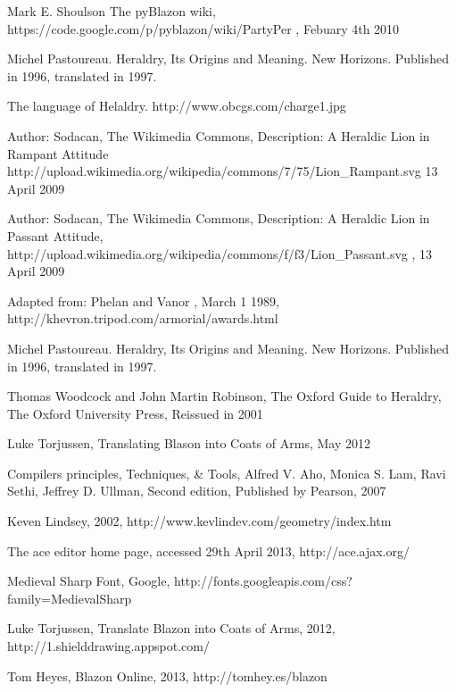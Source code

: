 \begin{thebibliography}{100}

  	Mark E. Shoulson
 	The pyBlazon wiki, 
 	https://code.google.com/p/pyblazon/wiki/PartyPer , 
 	Febuary 4th 2010


	Michel Pastoureau. 
	Heraldry, Its Origins and Meaning.
	New Horizons. 
	Published in 1996, translated in 1997.


	The language of Helaldry.
	http://www.obcgs.com/charge1.jpg

	Author: Sodacan,  
	The Wikimedia Commons,
	Description: A Heraldic Lion in Rampant Attitude
	http://upload.wikimedia.org/wikipedia/commons/7/75/Lion\_Rampant.svg
	13 April 2009

	Author: Sodacan,
	The Wikimedia Commons, 
	Description: A Heraldic Lion in Passant Attitude, 
	http://upload.wikimedia.org/wikipedia/commons/f/f3/Lion\_Passant.svg ,
	13 April 2009
	
	Adapted from: 
	Phelan and Vanor , 
	March 1 1989, 
	http://khevron.tripod.com/armorial/awards.html


	Michel Pastoureau. 
	Heraldry, Its Origins and Meaning.
	New Horizons. 
	Published in 1996, translated in 1997.


	Thomas Woodcock and John Martin Robinson, 
	The Oxford Guide to Heraldry, 
	The Oxford University Press, 
	Reissued in 2001


	Luke Torjussen, 
	Translating Blason into Coats of Arms, 
	May 2012

	Compilers principles, Techniques, \& Tools, 
	Alfred V. Aho, Monica S. Lam, Ravi Sethi, Jeffrey D. Ullman, 
	Second edition,  Published by Pearson, 
	2007 

	Keven Lindsey,
	2002,
	http://www.kevlindev.com/geometry/index.htm


	The ace editor home page, 
	accessed 29th April 2013, 
	http://ace.ajax.org/

	Medieval Sharp Font, 
	Google, 
	http://fonts.googleapis.com/css?family=MedievalSharp


	Luke Torjussen,
	Translate Blazon into Coats of Arms,
	2012,
	http://1.shielddrawing.appspot.com/


	Tom Heyes, 
	Blazon Online, 
	2013, 
	http://tomhey.es/blazon

\end{thebibliography}
